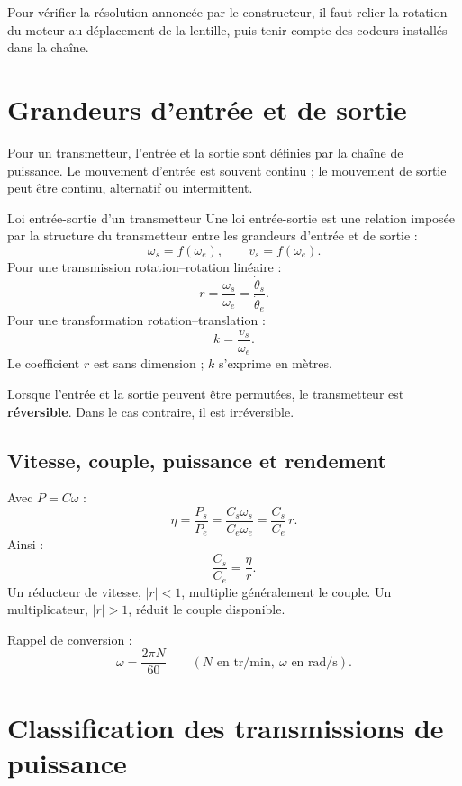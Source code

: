 \begin{center}
\hfill
{}\hfill
{}
\end{center}

Pour vérifier la résolution annoncée par le constructeur, il faut relier
la rotation du moteur au déplacement de la lentille, puis tenir compte
des codeurs installés dans la chaîne.

\section{Grandeurs d'entrée et de sortie}
\label{sec:trans-grandeurs}

Pour un transmetteur, l'entrée et la sortie sont définies par la chaîne
de puissance. Le mouvement d'entrée est souvent continu ; le mouvement
de sortie peut être continu, alternatif ou intermittent.

\begin{TLThreeDef}{Loi entrée-sortie d'un transmetteur}
Une loi entrée-sortie est une relation imposée par la structure du
transmetteur entre les grandeurs d'entrée et de sortie :
\[
\omega_s=f(\omega_e),
\qquad
v_s=f(\omega_e).
\]
Pour une transmission rotation--rotation linéaire :
\[
\boxed{r=\frac{\omega_s}{\omega_e}
=\frac{\dot\theta_s}{\dot\theta_e}.}
\]
Pour une transformation rotation--translation :
\[
\boxed{k=\frac{v_s}{\omega_e}.}
\]
Le coefficient $r$ est sans dimension ; $k$ s'exprime en mètres.
\end{TLThreeDef}

Lorsque l'entrée et la sortie peuvent être permutées, le transmetteur est
\textbf{réversible}. Dans le cas contraire, il est irréversible.

\subsection{Vitesse, couple, puissance et rendement}

Avec $P=C\omega$ :
\[
\eta=\frac{P_s}{P_e}
=\frac{C_s\omega_s}{C_e\omega_e}
=\frac{C_s}{C_e}\,r.
\]
Ainsi :
\[
\boxed{\frac{C_s}{C_e}=\frac{\eta}{r}.}
\]
Un réducteur de vitesse, $|r|<1$, multiplie généralement le couple. Un
multiplicateur, $|r|>1$, réduit le couple disponible.

Rappel de conversion :
\[
\boxed{\omega=\frac{2\pi N}{60}}
\qquad
(N\text{ en tr/min},\ \omega\text{ en rad/s}).
\]

\section{Classification des transmissions de puissance}
\label{sec:trans-classification}


